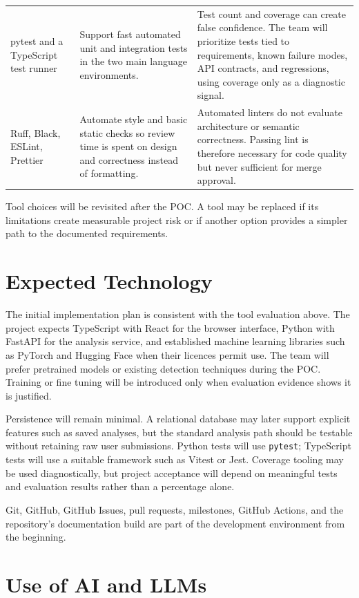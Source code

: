 \documentclass{article}
\begin{document}
\begin{longtable}{>{\raggedright\arraybackslash}p{}>{\raggedright\arraybackslash}p{}>{\raggedright\arraybackslash}p{}}
\addlinespace
pytest and a TypeScript test runner & Support fast automated unit and integration tests in the two main language environments. & Test count and coverage can create false confidence. The team will prioritize tests tied to requirements, known failure modes, API contracts, and regressions, using coverage only as a diagnostic signal.\\
\addlinespace
Ruff, Black, ESLint, Prettier & Automate style and basic static checks so review time is spent on design and correctness instead of formatting. & Automated linters do not evaluate architecture or semantic correctness. Passing lint is therefore necessary for code quality but never sufficient for merge approval.\\
\bottomrule
\end{longtable}
\normalsize

Tool choices will be revisited after the POC. A tool may be replaced if its limitations create measurable project risk or if another option provides a simpler path to the documented requirements.

\section{Expected Technology}

The initial implementation plan is consistent with the tool evaluation above. The project expects TypeScript with React for the browser interface, Python with FastAPI for the analysis service, and established machine learning libraries such as PyTorch and Hugging Face when their licences permit use. The team will prefer pretrained models or existing detection techniques during the POC. Training or fine tuning will be introduced only when evaluation evidence shows it is justified.

Persistence will remain minimal. A relational database may later support explicit features such as saved analyses, but the standard analysis path should be testable without retaining raw user submissions. Python tests will use \texttt{pytest}; TypeScript tests will use a suitable framework such as Vitest or Jest. Coverage tooling may be used diagnostically, but project acceptance will depend on meaningful tests and evaluation results rather than a percentage alone.

Git, GitHub, GitHub Issues, pull requests, milestones, GitHub Actions, and the repository's documentation build are part of the development environment from the beginning.

\section{Use of AI and LLMs}
\end{document}

